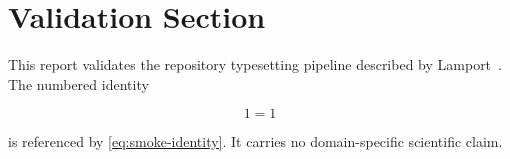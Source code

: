 \section{Validation Section}

This report validates the repository typesetting pipeline described by
Lamport~\cite{lamport1994latex}. The numbered identity

\begin{equation}
  1 = 1
  \label{eq:smoke-identity}
\end{equation}

is referenced by \cref{eq:smoke-identity}. It carries no domain-specific
scientific claim.
